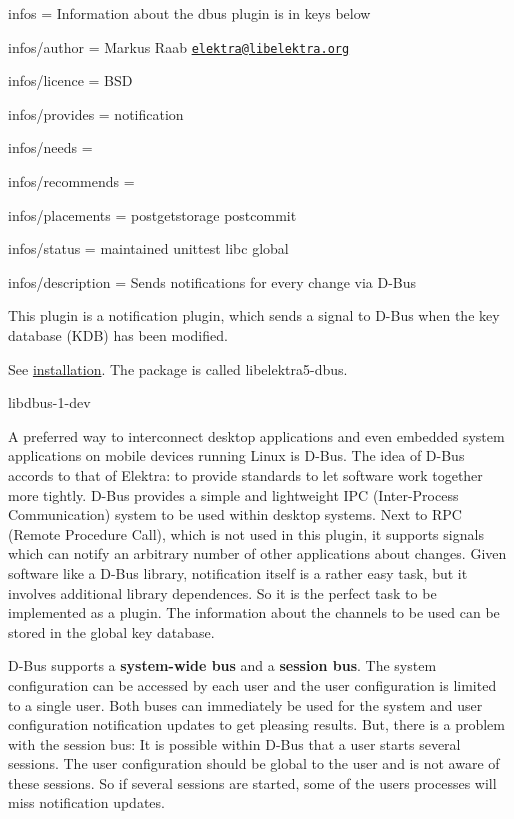 
\begin{DoxyItemize}
\item infos = Information about the dbus plugin is in keys below
\item infos/author = Markus Raab \href{mailto:elektra@libelektra.org}{\tt elektra@libelektra.\+org}
\item infos/licence = B\+SD
\item infos/provides = notification
\item infos/needs =
\item infos/recommends =
\item infos/placements = postgetstorage postcommit
\item infos/status = maintained unittest libc global
\item infos/description = Sends notifications for every change via D-\/\+Bus
\end{DoxyItemize}

This plugin is a notification plugin, which sends a signal to D-\/\+Bus when the key database (K\+DB) has been modified.

See \hyperlink{doc_INSTALL_md}{installation}. The package is called {\ttfamily libelektra5-\/dbus}.


\begin{DoxyItemize}
\item {\ttfamily libdbus-\/1-\/dev}
\end{DoxyItemize}

A preferred way to interconnect desktop applications and even embedded system applications on mobile devices running Linux is D-\/\+Bus. The idea of D-\/\+Bus accords to that of Elektra\+: to provide standards to let software work together more tightly. D-\/\+Bus provides a simple and lightweight I\+PC (Inter-\/\+Process Communication) system to be used within desktop systems. Next to R\+PC (Remote Procedure Call), which is not used in this plugin, it supports signals which can notify an arbitrary number of other applications about changes. Given software like a D-\/\+Bus library, notification itself is a rather easy task, but it involves additional library dependences. So it is the perfect task to be implemented as a plugin. The information about the channels to be used can be stored in the global key database.

D-\/\+Bus supports a {\bfseries system-\/wide bus} and a {\bfseries session bus}. The system configuration can be accessed by each user and the user configuration is limited to a single user. Both buses can immediately be used for the system and user configuration notification updates to get pleasing results. But, there is a problem with the session bus\+: It is possible within D-\/\+Bus that a user starts several sessions. The user configuration should be global to the user and is not aware of these sessions. So if several sessions are started, some of the user\textquotesingle{}s processes will miss notification updates.

